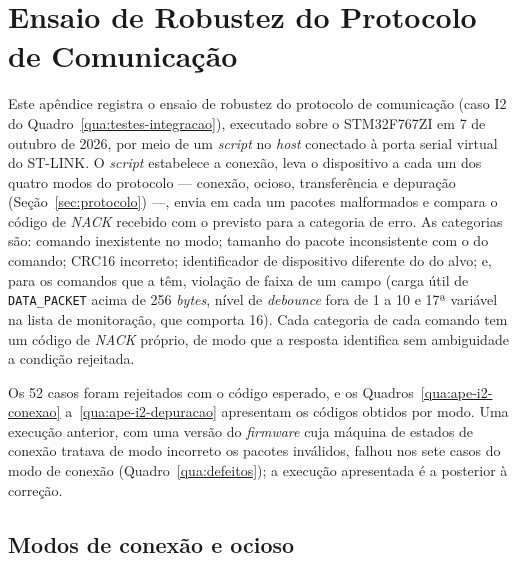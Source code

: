 \chapter{Ensaio de Robustez do Protocolo de Comunicação}
\label{ape:protocolo}

Este apêndice registra o ensaio de robustez do protocolo de comunicação (caso I2 do Quadro~\ref{qua:testes-integracao}), executado sobre o STM32F767ZI em 7 de outubro de 2026, por meio de um \textit{script} no \textit{host} conectado à porta serial virtual do ST-LINK.
O \textit{script} estabelece a conexão, leva o dispositivo a cada um dos quatro modos do protocolo --- conexão, ocioso, transferência e depuração (Seção~\ref{sec:protocolo}) ---, envia em cada um pacotes malformados e compara o código de \textit{NACK} recebido com o previsto para a categoria de erro.
As categorias são: comando inexistente no modo; tamanho do pacote inconsistente com o do comando; CRC16 incorreto; identificador de dispositivo diferente do do alvo; e, para os comandos que a têm, violação de faixa de um campo (carga útil de \texttt{DATA\_PACKET} acima de 256 \textit{bytes}, nível de \textit{debounce} fora de 1 a 10 e 17ª variável na lista de monitoração, que comporta 16).
Cada categoria de cada comando tem um código de \textit{NACK} próprio, de modo que a resposta identifica sem ambiguidade a condição rejeitada.

Os 52 casos foram rejeitados com o código esperado, e os Quadros~\ref{qua:ape-i2-conexao} a~\ref{qua:ape-i2-depuracao} apresentam os códigos obtidos por modo.
Uma execução anterior, com uma versão do \textit{firmware} cuja máquina de estados de conexão tratava de modo incorreto os pacotes inválidos, falhou nos sete casos do modo de conexão (Quadro~\ref{qua:defeitos}); a execução apresentada é a posterior à correção.

\section{Modos de conexão e ocioso}
\label{sec:ape-i2-conexao}

